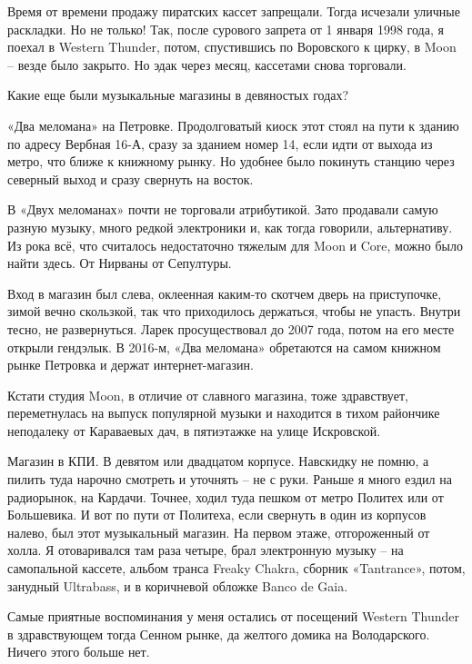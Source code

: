 Время от времени продажу пиратских кассет запрещали. Тогда исчезали уличные раскладки. Но не только! Так, после сурового запрета от 1 января 1998 года, я поехал в Western Thunder, потом, спустившись по Воровского к цирку, в Moon – везде было закрыто. Но эдак через месяц, кассетами снова торговали.

Какие еще были музыкальные магазины в девяностых годах?

«Два меломана» на Петровке. Продолговатый киоск этот стоял на пути к зданию по адресу Вербная 16-А, сразу за зданием номер 14, если идти от выхода из метро, что ближе к книжному рынку. Но удобнее было покинуть станцию через северный выход и сразу свернуть на восток.

В «Двух меломанах» почти не торговали атрибутикой. Зато продавали самую разную музыку, много редкой электроники и, как тогда говорили, альтернативу. Из рока всё, что считалось недостаточно тяжелым для Moon и Core, можно было найти здесь. От Нирваны от Сепултуры.

Вход в магазин был слева, оклеенная каким-то скотчем дверь на приступочке, зимой вечно скользкой, так что приходилось держаться, чтобы не упасть. Внутри тесно, не развернуться. Ларек просуществовал до 2007 года, потом на его месте открыли гендэлык. В 2016-м, «Два меломана» обретаются на самом книжном рынке Петровка и держат интернет-магазин.

Кстати студия Moon, в отличие от славного магазина, тоже здравствует, переметнулась на выпуск популярной музыки и находится в тихом райончике неподалеку от Караваевых дач, в пятиэтажке на улице Искровской.

Магазин в КПИ. В девятом или двадцатом корпусе. Навскидку не помню, а пилить туда нарочно смотреть и уточнять – не с руки. Раньше я много ездил на радиорынок, на Кардачи. Точнее, ходил туда пешком от метро Политех или от Большевика. И вот по пути от Политеха, если свернуть в один из корпусов налево, был этот музыкальный магазин. На первом этаже, отгороженный от холла. Я отоваривался там раза четыре, брал электронную музыку – на самопальной кассете, альбом транса Freaky Chakra, сборник «Tantrance», потом, занудный Ultrabass, и в коричневой обложке Banco de Gaia.

Самые приятные воспоминания у меня остались от посещений Western Thunder в здравствующем тогда Сенном рынке, да желтого домика на Володарского. Ничего этого больше нет.

